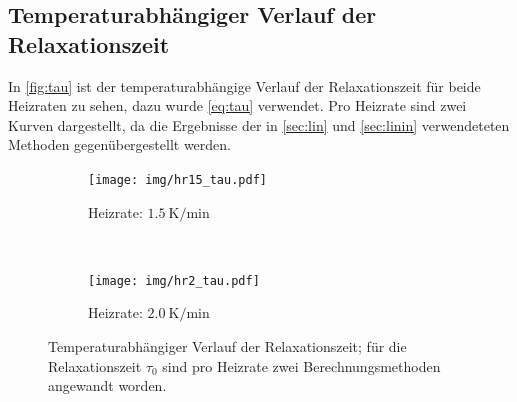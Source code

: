 \subsection{Temperaturabhängiger Verlauf der Relaxationszeit}

In \autoref{fig:tau} ist der temperaturabhängige Verlauf der Relaxationszeit für beide Heizraten zu sehen, dazu wurde \autoref{eq:tau} verwendet. Pro Heizrate sind zwei Kurven dargestellt, da die Ergebnisse der in \autoref{sec:lin} und \autoref{sec:linin} verwendeteten Methoden gegenübergestellt werden.

\begin{figure}[htp]
    \centering
    \begin{subfigure}[t]{0.5\textwidth}
        \centering
        \texttt{[image: img/hr15\_tau.pdf]}
        \caption{Heizrate: $\SI{1.5}{\kelvin\per\minute}$}
    \end{subfigure}%
    ~
    \begin{subfigure}[t]{0.5\textwidth}
        \centering
        \texttt{[image: img/hr2\_tau.pdf]}
        \caption{Heizrate: $\SI{2.0}{\kelvin\per\minute}$}
    \end{subfigure}
    \caption{Temperaturabhängiger Verlauf der Relaxationszeit; für die Relaxationszeit $\tau_0$ sind  pro Heizrate zwei Berechnungsmethoden angewandt worden.}
    \label{fig:tau}
\end{figure}
